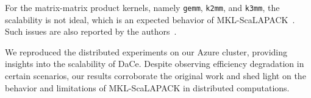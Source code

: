 For the matrix-matrix product kernels, namely \texttt{gemm}, \texttt{k2mm}, and \texttt{k3mm}, the scalability is not ideal, which is an expected behavior of MKL-ScaLAPACK~\cite{matrixmatrix2019}. Such issues are also reported by the authors~\cite{dace2021}.

We reproduced the distributed experiments on our Azure cluster, providing insights into the scalability of DaCe. Despite observing efficiency degradation in certain scenarios, our results corroborate the original work and shed light on the behavior and limitations of MKL-ScaLAPACK in distributed computations.